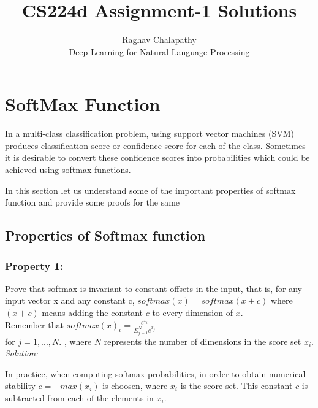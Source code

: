\documentclass[12pt]{article}
\begin{document}
 
 
 
\title{CS224d Assignment-1 Solutions }%
\author{Raghav Chalapathy\\ %
Deep Learning for Natural Language Processing} %
 
\maketitle
 
\section{ SoftMax Function}

In a multi-class classification problem, using  support vector machines (SVM)  produces  classification score  or confidence score for each of the class. Sometimes it is desirable  to convert  these confidence scores into probabilities which could be achieved using softmax functions.


In this section let us understand some of the important properties of softmax function and provide some proofs for the same
\subsection{Properties of Softmax function}

\subsubsection{Property 1:}
Prove that softmax is invariant to constant offsets in the input, that is, for any input vector
x and any constant c,
$softmax(x) = softmax(x + c)$
where $(x + c)$ means adding the constant $c$ to every dimension of $x$. \\

Remember that $softmax(x)_{i}= \frac{e^{x_{i}}} {\Sigma _{j=1}^Ne^{x_{j}} }$ \\ for $j = 1,...,N.$ , where $N$ represents the number of dimensions in the score set $x_{i}$.\\

\textit{Solution:}

In practice, when computing softmax probabilities, in order to obtain numerical stability $c = -max(x_{i})$ is choosen, where $x_{i}$ is the score set. This constant $c$ is subtracted from each of the elements in $x_{i}$.
\end{document}
